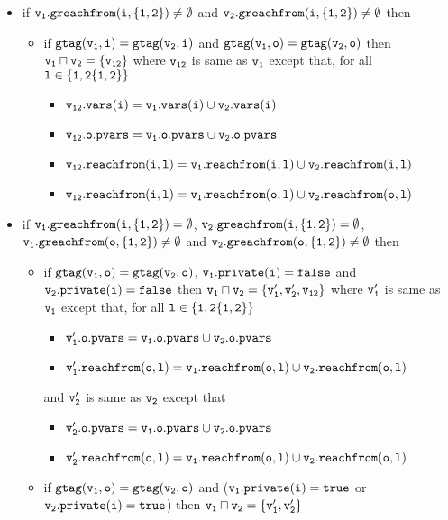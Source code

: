  \begin{itemize}
 \item if $\tt \mathtt{v}_1.greachfrom(i,\{1,2\}) \neq \emptyset$ and $\tt \mathtt{v}_2.greachfrom(i,\{1,2\}) \neq \emptyset$ then 
  \begin{itemize}
  \item if $\tt gtag(\mathtt{v}_1, i) = gtag(\mathtt{v}_2, i)$ and $\tt gtag(\mathtt{v}_1, o) = gtag(\mathtt{v}_2, o)$ then $\tt \mathtt{v}_1 \sqcap \mathtt{v}_2 = \{\mathtt{v}_{12}\}$ where $\tt \mathtt{v}_{12}$ is same as $\tt \mathtt{v}_1$ except that, for all $\tt l \in \{1,2 \{1,2\}\}$ 
  \begin{itemize}
  \item $\tt \mathtt{v}_{12}.vars(i) = \mathtt{v}_1.vars(i) \cup \mathtt{v}_2.vars(i)$ 
  \item  $\tt \mathtt{v}_{12}.\mathtt{o}.\mathtt{pvars} = \mathtt{v}_1.\mathtt{o}.\mathtt{pvars} \cup \mathtt{v}_2.\mathtt{o}.\mathtt{pvars}$
  \item $\tt \mathtt{v}_{12}.reachfrom(i,l) = \mathtt{v}_{1}.reachfrom(i,l) \cup \mathtt{v}_{2}.reachfrom(i,l)$
   \item $\tt \mathtt{v}_{12}.reachfrom(i,l) = \mathtt{v}_{1}.reachfrom(o,l) \cup \mathtt{v}_{2}.reachfrom(o,l)$
    \end{itemize}
 \end{itemize}

 \item if $\tt \mathtt{v}_1.greachfrom(i,\{1,2\}) = \emptyset$, $\tt \mathtt{v}_2.greachfrom(i,\{1,2\}) = \emptyset$, $\tt \mathtt{v}_1.greachfrom(o,\{1,2\}) \neq \emptyset$ and $\tt \mathtt{v}_2.greachfrom(o,\{1,2\}) \neq \emptyset$ then 
  \begin{itemize}
  \item if $\tt gtag(\mathtt{v}_1, o) = gtag(\mathtt{v}_2, o)$, $\tt \mathtt{v}_1.private(i) = false$ and $\tt \mathtt{v}_2.private(i) = false$ then $\tt \mathtt{v}_1 \sqcap \mathtt{v}_2 = \{\mathtt{v}_1', \mathtt{v}_2', \mathtt{v}_{12}\}$ where %
  $\tt \mathtt{v}_1'$ is same as $\tt \mathtt{v}_1$ except that, for all $\tt l \in \{1,2 \{1,2\}\}$
    \begin{itemize}
  \item  $\tt \mathtt{v}_1'.\mathtt{o}.\mathtt{pvars} = \mathtt{v}_1.\mathtt{o}.\mathtt{pvars} \cup \mathtt{v}_2.\mathtt{o}.\mathtt{pvars}$
  \item $\tt \mathtt{v}_1'.reachfrom(o,l) = \mathtt{v}_{1}.reachfrom(o,l) \cup \mathtt{v}_{2}.reachfrom(o,l)$
    \end{itemize}
   and $\tt \mathtt{v}_2'$ is same as $\tt \mathtt{v}_2$ except that 
    \begin{itemize}
  \item  $\tt \mathtt{v}_2'.\mathtt{o}.\mathtt{pvars} = \mathtt{v}_1.\mathtt{o}.\mathtt{pvars} \cup \mathtt{v}_2.\mathtt{o}.\mathtt{pvars}$
  \item $\tt \mathtt{v}_2'.reachfrom(o,l) = \mathtt{v}_{1}.reachfrom(o,l) \cup \mathtt{v}_{2}.reachfrom(o,l)$
    \end{itemize}
     \item if $\tt gtag(\mathtt{v}_1, o) = gtag(\mathtt{v}_2, o)$ and ($\tt \mathtt{v}_1.private(i) = true$ or $\tt \mathtt{v}_2.private(i) = true$) then $\tt \mathtt{v}_1 \sqcap \mathtt{v}_2 = \{\mathtt{v}_1', \mathtt{v}_2'\}$ 
 \end{itemize}
 

\end{itemize}
